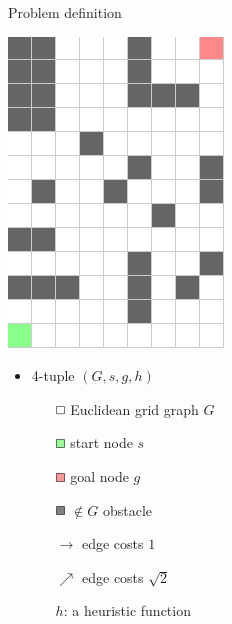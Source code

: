 \documentclass{presentation}
\begin{document}
\begin{frame}{Problem definition}
	\begin{minipage}{0.3\textwidth}

	\includegraphics[width=\textwidth]{figures/gridgraph.png}
	
	\end{minipage}%
	\hfill%
	\begin{minipage}{0.6\textwidth}
	

	\begin{itemize}
		\item 4-tuple $(G, s, g, h)$
		\pause
		\begin{itemize}
		\item[$\tikz{\path[draw=black,fill=white] (0,0) rectangle (2mm,2mm);}$] Euclidean grid graph $G$
		\item[$\tikz{\path[draw=black,fill=white!60!green] (0,0) rectangle (2mm,2mm);}$] start node $s$
		\item[$\tikz{\path[draw=black,fill=white!60!red] (0,0) rectangle (2mm,2mm);}$] goal node $g$
		\item[$\tikz{\path[draw=black,fill=gray] (0,0) rectangle (2mm,2mm);}$] $\not\in G$ obstacle
		\pause
		\item[$\rightarrow$] edge costs $1$
		\item[$\nearrow$] edge costs $\sqrt{2}$
		\pause
		\item[$h$:] a heuristic function
		\end{itemize}
	\end{itemize}
	

\end{minipage}
\end{frame}
\end{document}
